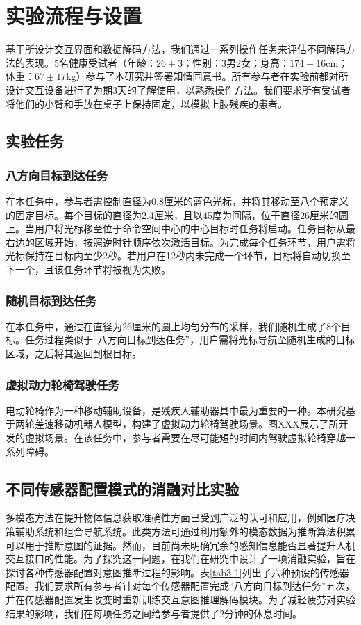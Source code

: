 \section{实验流程与设置}基于所设计交互界面和数据解码方法，我们通过一系列操作任务来评估不同解码方法的表现。5名健康受试者（年龄：$26\pm3$；性别：3男2女；身高：$174\pm16$cm；体重：$67\pm17$kg）参与了本研究并签署知情同意书。所有参与者在实验前都对所设计交互设备进行了为期3天的了解使用，以熟悉操作方法。我们要求所有受试者将他们的小臂和手放在桌子上保持固定，以模拟上肢残疾的患者。

\subsection{实验任务}   
    \subsubsection{八方向目标到达任务}在本任务中，参与者需控制直径为0.8厘米的蓝色光标，并将其移动至八个预定义的固定目标。每个目标的直径为2.4厘米，且以45度为间隔，位于直径26厘米的圆上。当用户将光标移至位于命令空间中心的中心目标时任务将启动。任务目标从最右边的区域开始，按照逆时针顺序依次激活目标。为完成每个任务环节，用户需将光标保持在目标内至少2秒。若用户在12秒内未完成一个环节，目标将自动切换至下一个，且该任务环节将被视为失败。

   \subsubsection{随机目标到达任务}在本任务中，通过在直径为26厘米的圆上均匀分布的采样，我们随机生成了8个目标。任务过程类似于``八方向目标到达任务''，用户需将光标导航至随机生成的目标区域，之后将其返回到根目标。

   \subsubsection{虚拟动力轮椅驾驶任务}电动轮椅作为一种移动辅助设备，是残疾人辅助器具中最为重要的一种。本研究基于两轮差速移动机器人模型，构建了虚拟动力轮椅驾驶场景。图XXX展示了所开发的虚拟场景。在该任务中，参与者需要在尽可能短的时间内驾驶虚拟轮椅穿越一系列障碍。  

\subsection{不同传感器配置模式的消融对比实验} 多模态方法在提升物体信息获取准确性方面已受到广泛的认可和应用，例如医疗决策辅助系统和组合导航系统\cite{williamsonContinuousUncertainInteraction2006}。此类方法可通过利用额外的模态数据为推断算法积累可以用于推断意图的证据。然而，目前尚未明确冗余的感知信息能否显著提升人机交互接口的性能。为了探究这一问题，在我们在研究中设计了一项消融实验，旨在探讨各种传感器配置对意图推断过程的影响。表\ref{tab3-1}列出了六种预设的传感器配置。我们要求所有参与者针对每个传感器配置完成``八方向目标到达任务''五次，并在传感器配置发生改变时重新训练交互意图推理解码模块。为了减轻疲劳对实验结果的影响，我们在每项任务之间给参与者提供了2分钟的休息时间。 


